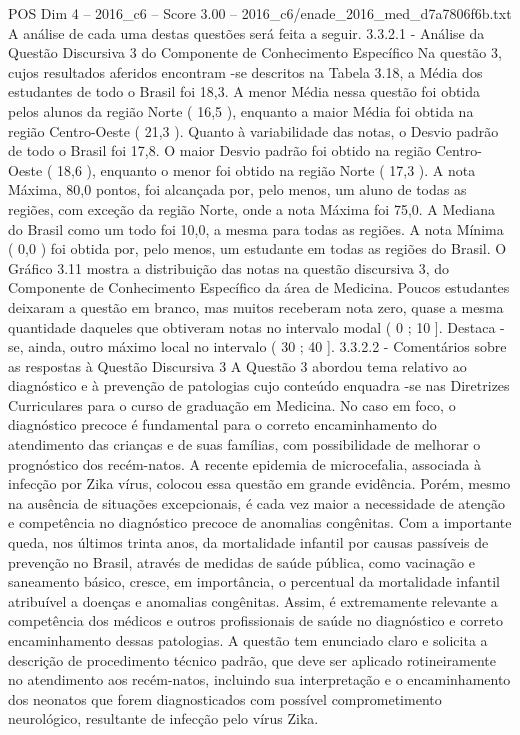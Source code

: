 \begin{textsample}{POS Dim 4 – 2016\_c6 – Score 3.00 – 2016\_c6/enade\_2016\_med\_d7a7806f6b.txt}
A análise de cada uma destas questões será feita a seguir. 3.3.2.1 - Análise da Questão Discursiva 3 do Componente de Conhecimento Específico Na questão 3, cujos resultados aferidos encontram -se descritos na Tabela 3.18, a Média dos estudantes de todo o Brasil foi 18,3.
A menor Média nessa questão foi obtida pelos alunos da região Norte ( 16,5 ), enquanto a maior Média foi obtida na região Centro-Oeste ( 21,3 ).
Quanto à variabilidade das notas, o Desvio padrão de todo o Brasil foi 17,8.
O maior Desvio padrão foi obtido na região Centro-Oeste ( 18,6 ), enquanto o menor foi obtido na região Norte ( 17,3 ).
A nota Máxima, 80,0 pontos, foi alcançada por, pelo menos, um aluno de todas as regiões, com exceção da região Norte, onde a nota Máxima foi 75,0.
A Mediana do Brasil como um todo foi 10,0, a mesma para todas as regiões.
A nota Mínima ( 0,0 ) foi obtida por, pelo menos, um estudante em todas as regiões do Brasil.
O Gráfico 3.11 mostra a distribuição das notas na questão discursiva 3, do Componente de Conhecimento Específico da área de Medicina.
Poucos estudantes deixaram a questão em branco, mas muitos receberam nota zero, quase a mesma quantidade daqueles que obtiveram notas no intervalo modal ( 0 ; 10 ].
Destaca -se, ainda, outro máximo local no intervalo ( 30 ; 40 ]. 3.3.2.2 - Comentários sobre as respostas à Questão Discursiva 3 A Questão 3 abordou tema relativo ao diagnóstico e à prevenção de patologias cujo conteúdo enquadra -se nas Diretrizes Curriculares para o curso de graduação em Medicina.
No caso em foco, o diagnóstico precoce é fundamental para o correto encaminhamento do atendimento das crianças e de suas famílias, com possibilidade de melhorar o prognóstico dos recém-natos.
A recente epidemia de microcefalia, associada à infecção por Zika vírus, colocou essa questão em grande evidência.
Porém, mesmo na ausência de situações excepcionais, é cada vez maior a necessidade de atenção e competência no diagnóstico precoce de anomalias congênitas.
Com a importante queda, nos últimos trinta anos, da mortalidade infantil por causas passíveis de prevenção no Brasil, através de medidas de saúde pública, como vacinação e saneamento básico, cresce, em importância, o percentual da mortalidade infantil atribuível a doenças e anomalias congênitas.
Assim, é extremamente relevante a competência dos médicos e outros profissionais de saúde no diagnóstico e correto encaminhamento dessas patologias.
A questão tem enunciado claro e solicita a descrição de procedimento técnico padrão, que deve ser aplicado rotineiramente no atendimento aos recém-natos, incluindo sua interpretação e o encaminhamento dos neonatos que forem diagnosticados com possível comprometimento neurológico, resultante de infecção pelo vírus Zika.

\end{textsample}
